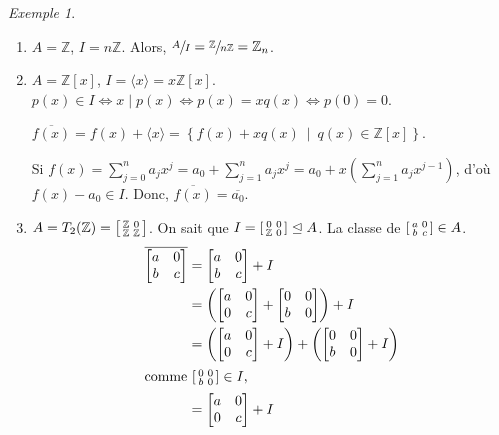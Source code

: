 \documentclass{report}
\theoremstyle{definition}
\theoremstyle{remark}
\newtheorem*{exem}{Exemple}
\def\ZZ{\mathbb{Z}}
\begin{document}
	\begin{exem}
		\begin{enumerate}
			\item $A=\ZZ$, $I=n\ZZ$. Alors, $\sfrac{A}{I}=\sfrac{\ZZ}{n\ZZ}=\ZZ_n$.
			\item $A=\ZZ[x]$, $I=\langle x \rangle = x\ZZ[x]$. $p(x)\in I \Longleftrightarrow x \mid p(x) \Longleftrightarrow p(x)=xq(x) \Longleftrightarrow p(0)=0$.

			$\overline{f(x)} = f(x)+\langle x \rangle = \left\{ f(x)+xq(x) ~\middle|~ q(x)\in\ZZ[x] \right\}$.

			Si $f(x) = \sum_{j=0}^{n}a_jx^j = a_0+\sum_{j=1}^{n}a_jx^j = a_0+x\left(\sum_{j=1}^{n}a_jx^{j-1}\right)$, d'o\`u $f(x)-a_0\in I$. Donc, $\overline{f(x)}=\overline{a_0}$.
			\item $A=T_2(\ZZ) = \begin{bsmallmatrix}
				\ZZ&0\\\ZZ&\ZZ
			\end{bsmallmatrix}$. On sait que $I=\begin{bsmallmatrix}
				0&0\\\ZZ&0
			\end{bsmallmatrix}\trianglelefteq A$. La classe de $\begin{bsmallmatrix}
				a&0\\b&c
			\end{bsmallmatrix}\in A$.
			\begin{align*}
				\overline{\begin{bmatrix}
						a&0\\b&c
				\end{bmatrix}}&= \begin{bmatrix}
					a&0\\b&c
			\end{bmatrix}+I\\
			&= \left(\begin{bmatrix}
				a&0\\0&c
			\end{bmatrix}+\begin{bmatrix}
				0&0\\b&0
			\end{bmatrix}\right)+I\\
			&= \left(\begin{bmatrix}
				a&0\\0&c
			\end{bmatrix}+I\right)+\left(\begin{bmatrix}
				0&0\\b&0
			\end{bmatrix}+I\right)\\
			\shortintertext{comme $\begin{bsmallmatrix}
					0&0\\b&0
				\end{bsmallmatrix}\in I$,}
			&= \begin{bmatrix}
				a&0\\0&c
			\end{bmatrix}+I
			\end{align*}


\end{enumerate}
\end{exem}
\end{document}

